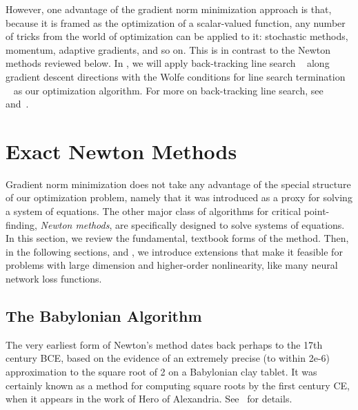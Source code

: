\documentclass[../../thesis.tex]{subfiles}
\begin{document}
However, one advantage of the gradient norm minimization approach
is that, because it is framed as the optimization
of a scalar-valued function, any number of tricks
from the world of optimization can be applied to it:
stochastic methods, momentum, adaptive gradients,
and so on.
This is in contrast to the Newton methods reviewed below.
In ,
we will apply back-tracking line search%
~\cite{armijo1966}
along gradient descent directions
with the Wolfe conditions for line search termination%
~\cite{wolfe1971}
as our optimization algorithm.
For more on back-tracking line search,
see~
and~\cite[Section 9.2]{boyd2004}.

\section{Exact Newton Methods}

Gradient norm minimization does not take any advantage
of the special structure of our optimization problem,
namely that it was introduced
as a proxy for solving a system of equations.
The other major class of algorithms
for critical point-finding,
\emph{Newton methods},
are specifically designed to solve systems of equations.
In this section,
we review the fundamental, textbook forms
of the method.
Then, in the following sections,
 and ,
we introduce extensions that make it feasible for
problems with large dimension and higher-order nonlinearity,
like many neural network loss functions.

\subsection{The Babylonian Algorithm}

The very earliest form of Newton's method
dates back perhaps to the 17th century BCE,
based on the evidence of an extremely precise
(to within 2e-6)
approximation to the square root of 2
on a Babylonian clay tablet.
It was certainly known as a method
for computing square roots by the first century CE,
when it appears in the work of Hero of Alexandria.
See~\cite{brown1999} for details.
\end{document}
